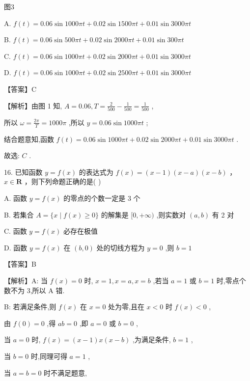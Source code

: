 \documentclass[10pt]{article}
\begin{document}
图3

A. \(f\left( t\right)  = {0.06}\sin {1000\pi t} + {0.02}\sin {1500\pi t} + {0.01}\sin {3000\pi t}\)

B. \(f\left( t\right)  = {0.06}\sin {500\pi t} + {0.02}\sin {2000\pi t} + {0.01}\sin {300\pi t}\)

C. \(f\left( t\right)  = {0.06}\sin {1000\pi t} + {0.02}\sin {2000\pi t} + {0.01}\sin {3000\pi t}\)

D. \(f\left( t\right)  = {0.06}\sin {1000\pi t} + {0.02}\sin {2500\pi t} + {0.01}\sin {3000\pi t}\)

【答案】C

【解析】由图 1 知, \(A = {0.06},T = \frac{2}{500} - \frac{1}{500} = \frac{1}{500}\) ,

所以 \(\omega  = \frac{2\pi }{T} = {1000\pi }\) ,所以 \(y = {0.06}\sin {1000\pi t}\) ;

结合题意知,函数 \(f\left( t\right)  = {0.06}\sin {1000\pi t} + {0.02}\sin {2000\pi t} + {0.01}\sin {3000\pi t}\) .

故选: \(C\) .

16. 已知函数 \(y = f\left( x\right)\) 的表达式为 \(f\left( x\right)  = \left( {x - 1}\right) \left( {x - a}\right) \left( {x - b}\right)\) ， \(x \in  \mathbf{R}\) ，则下列命题正确的是( )

A. 函数 \(y = f\left( x\right)\) 的零点的个数一定是 3 个

B. 若集合 \(A = \{ x \mid  f\left( x\right)  \geq  0\}\) 的解集是 \(\lbrack 0, + \infty )\) ,则实数对 \(\left( {a,b}\right)\) 有 2 对

C. 函数 \(y = f\left( x\right)\) 必存在极值

D. 函数 \(y = f\left( x\right)\) 在 \(\left( {b,0}\right)\) 处的切线方程为 \(y = 0\) ,则 \(b = 1\)

【答案】B

【解析】A: 当 \(f\left( x\right)  = 0\) 时, \(x = 1,x = a,x = b\) ,若当 \(a = 1\) 或 \(b = 1\) 时,零点个数不为 3,所以 \(\mathrm{A}\) 错.

B: 若满足条件,则 \(f\left( x\right)\) 在 \(x = 0\) 处为零,且在 \(x < 0\) 时 \(f\left( x\right)  < 0\) ,

由 \(f\left( 0\right)  = 0\) ,得 \({ab} = 0\) ,即 \(a = 0\) 或 \(b = 0\) ,

当 \(a = 0\) 时, \(f\left( x\right)  = \left( {x - 1}\right) x\left( {x - b}\right)\) ,为满足条件, \(b = 1\) ,

当 \(b = 0\) 时,同理可得 \(a = 1\) ,

当 \(a = b = 0\) 时不满足题意,
\end{document}
